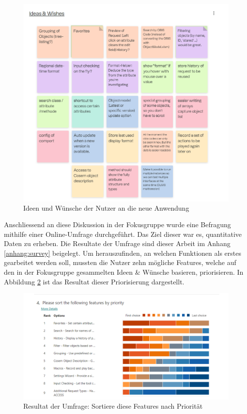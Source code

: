 \begin{figure}[H]
   \centering
   \includegraphics[width=1.0\textwidth]{gfx/S1_RetroBoard_IdeasAndWishes.png}
   \caption{
       Ideen und Wünsche der Nutzer an die neue Anwendung
   }
   \label{fig:IdeasAndWishes}
\end{figure}
Anschliessend an diese Diskussion in der Fokusgruppe wurde eine Befragung mithilfe einer Online-Umfrage durchgeführt.
Das Ziel dieser war es, quantitative Daten zu erheben.
Die Resultate der Umfrage sind dieser Arbeit im Anhang \ref{anhang:survey} beigelegt.
Um herauszufinden, an welchen Funktionen als erstes gearbeitet werden soll, mussten die Nutzer zehn mögliche Features, welche auf den in der Fokusgruppe gesammelten Ideen \& Wünsche basieren, priorisieren.
In Abbildung \ref{fig:FeaturesPrio} ist das Resultat dieser Priorisierung dargestellt.

\begin{figure}[H]
   \centering
   \includegraphics[width=1.0\textwidth]{gfx/S1_Survey_Prio.png}
   \caption{
       Resultat der Umfrage: Sortiere diese Features nach Priorität
   }
   \label{fig:FeaturesPrio}
\end{figure}

